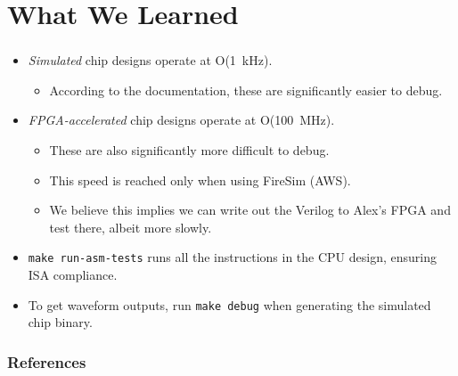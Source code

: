 \documentclass{../weeklyslides}
\begin{document}
\section{What We Learned}\label{sec:What_We_Learned}
\begin{frame}
  \frametitle{}
  \begin{itemize}
  \item \emph{Simulated} chip designs operate at O(\SI{1}{\kilo\hertz}).
    \begin{itemize}
    \item According to the documentation, these are significantly easier to debug.
    \end{itemize}
  \item \emph{FPGA-accelerated} chip designs operate at O(\SI{100}{\mega\hertz}).
    \begin{itemize}
    \item These are also significantly more difficult to debug.
    \item This speed is reached only when using FireSim (AWS).
    \item We believe this implies we can write out the Verilog to Alex's FPGA and test there, albeit more slowly.
    \end{itemize}
  \item \texttt{make run-asm-tests} runs all the instructions in the CPU design, ensuring ISA compliance.
  \item To get waveform outputs, run \texttt{make debug} when generating the simulated chip binary.
  \end{itemize}
\end{frame}

\begin{frame}
  \frametitle{References}
  \printbibliography[heading=bibintoc]{}
\end{frame}
\end{document}

